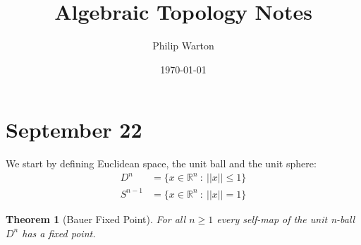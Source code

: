 \documentclass{article}
\newtheorem{theorem}{Theorem}[section]
\theoremstyle{definition}
\begin{document}
\title{Algebraic Topology Notes}
\author{Philip Warton}
\date{\today}
\maketitle
\section{September 22}
We start by defining Euclidean space, the unit ball and the unit sphere:
\begin{align}
    D^n &= \{x \in \mathbb{R}^n \ : \ ||x|| \leqslant 1 \} \\
    S^{n-1} &= \{x \in \mathbb{R}^n \ : \ ||x|| = 1\}
\end{align}
\begin{mdframed}[]
    \begin{theorem}[Bauer Fixed Point]
        For all $n \geqslant 1$ every self-map of the unit n-ball $D^n$ has a fixed point.
    \end{theorem}
\end{mdframed}
\end{document}
